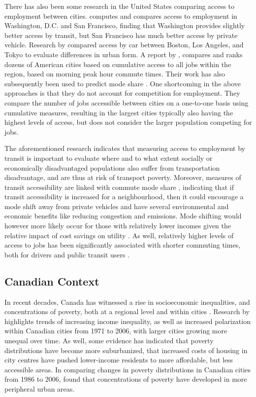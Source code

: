 \documentclass[11 pt, letterpaper]{article}
\begin{document}
{There has also been some research in the United States comparing access to employment between cities.  computes and compares access to employment in Washington, D.C. and San Francisco, finding that Washington provides slightly better access by transit, but San Francisco has much better access by private vehicle. Research by  compared access by car between Boston, Los Angeles, and Tokyo to evaluate differences in urban form. A report by , compares and ranks dozens of American cities based on cumulative access to all jobs within the region, based on morning peak hour commute times. Their work has also subsequently been used to predict mode share \cite{owen2015}. One shortcoming in the above approaches is that they do not account for competition for employment. They compare the number of jobs accessible between cities on a one-to-one basis using cumulative measures, resulting in the largest cities typically also having the highest levels of access, but does not consider the larger population competing for jobs. 

The aforementioned research indicates that measuring access to employment by transit is important to evaluate where and to what extent socially or economically disadvantaged populations also suffer from transportation disadvantage, and are thus at risk of transport poverty. Moreover, measures of transit accessibility are linked with commute mode share , indicating that if transit accessibility is increased for a neighbourhood, then it could encourage a mode shift away from private vehicles and have several environmental and economic benefits like reducing congestion and emissions. Mode shifting would however more likely occur for those with relatively lower incomes given the relative impact of cost savings on utility \cite{jara1989}. As well, relatively higher levels of access to jobs has been significantly associated with shorter commuting times, both for drivers and public transit users \cite{kawabata2007}.





\subsection{Canadian Context}

In recent decades, Canada has witnessed a rise in socioeconomic inequalities, and concentrations of poverty, both at a regional level \cite{breau2015rising} and within cities \cite{bolton2012,walks2013,hulchanski2010}.
Research by  highlights trends of increasing income inequality, as well as increased polarization within Canadian cities from 1971 to 2006, with larger cities growing more unequal over time. As well, some evidence has indicated that poverty distributions have become more suburbanized, that increased costs of housing in city centres have pushed lower-income residents to more affordable, but less accessible areas. In comparing changes in poverty distributions in Canadian cities from 1986 to 2006,  found that concentrations of poverty have developed in more peripheral urban areas.

}
\end{document}
